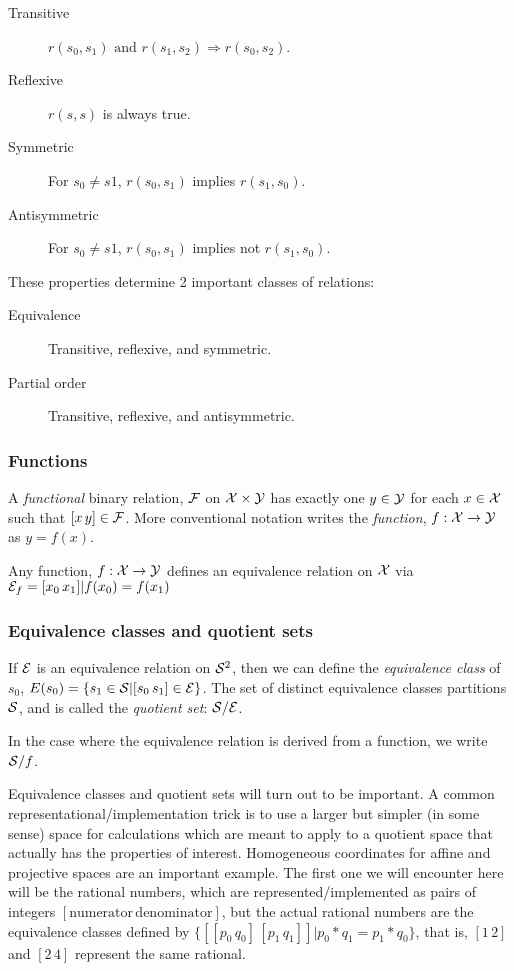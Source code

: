 \begin{description}
\item[Transitive]
$r(s_0,s_1) \text{ and } r(s_1,s_2) \Rightarrow r(s_0,s_2)$.
\item[Reflexive] $r(s,s)$ is always true.
\item[Symmetric] For $s_0 \neq s1$, $r(s_0,s_1)$ implies
$r(s_1,s_0)$.
\item[Antisymmetric] For $s_0 \neq s1$, $r(s_0,s_1)$ implies not
$r(s_1,s_0)$.
\end{description}
These properties determine 2 important classes of relations:
\begin{description}
\item[Equivalence] Transitive, reflexive, and symmetric.
\item[Partial order] Transitive, reflexive, and antisymmetric.
\end{description}

\subsubsection{Functions}

A \textit{functional} binary relation, $\mathcal{F}$ on $\mathcal{X}
\times \mathcal{Y}$ has exactly one $y \in \mathcal{Y}$ for each
$x \in \mathcal{X}$ such that $[x \, y] \in \mathcal{F}$.
More conventional notation writes the \textit{function}, 
$f : \mathcal{X} \rightarrow \mathcal{Y}$ as $y = f(x)$.

Any function, $f : \mathcal{X} \rightarrow \mathcal{Y}$ defines an
equivalence relation on $\mathcal{X}$ via 
$\mathcal{E}_f = {[x_0 \, x_1] | f(x_0) = f(x_1)}$

\subsubsection{Equivalence classes and quotient sets}

If $\mathcal{E}$ is an equivalence relation on $\mathcal{S}^2$, then we
can define the \textit{equivalence class} of $s_0$, $E(s_0) = \{
s_1 \in \mathcal{S} | [s_0 \, s_1] \in \mathcal{E} \}$.
The set of distinct equivalence classes partitions $\mathcal{S}$,
and is called the \textit{quotient set}: $\mathcal{S} / \mathcal{E}$.

In the case where the equivalence relation is derived from a
function, we write $\mathcal{S} / f$.

Equivalence classes and quotient sets will turn out to be
important. A common representational/implementation trick is to
use a larger but simpler (in some sense) space for calculations
which are meant to apply to a quotient space that actually has the
properties of interest. Homogeneous coordinates for affine and
projective spaces  are an important example.
The first one we will encounter here will be the rational numbers,
which are represented/implemented as pairs of integers
$[\text{numerator} \, \text{denominator}]$, but the actual
rational numbers are the equivalence classes defined by 
$\{ [[p_0 \, q_0] \, [p_1 \, q_1]] | p_0*q_1 = p_1*q_0 \}$,
that is, $[1 \, 2]$ and $[2 \, 4]$ represent the same rational.

